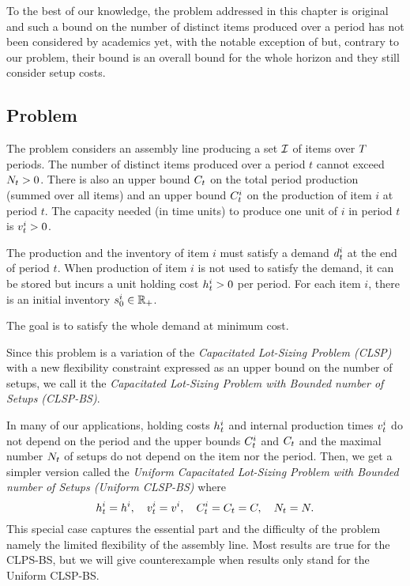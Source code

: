 To the best of our knowledge, the problem addressed in this chapter is original and such a bound on the number of distinct items produced over a period has not been considered by academics yet, with the notable exception of \cite{Rubaszewski2011} but, contrary to our problem, their bound is an overall bound for the whole horizon and they still consider setup costs.



\subsection{Problem}
\label{sec:PDP:deterministic:introduction:problem}

The problem considers an assembly line producing a set $\mathcal{I}$ of items over $T$ periods.
The number of distinct items produced over a period $t$ cannot exceed $N_t>0$.
There is also an upper bound $C_t$ on the total period production (summed over all items) and an upper bound $C_t^i$ on the production of item $i$ at period $t$.
The capacity needed (in time units) to produce one unit of $i$ in period $t$ is $v_t^i>0$.

The production and the inventory of item $i$ must satisfy a demand $d_t^i$ at the end of period $t$.
When production of item $i$ is not used to satisfy the demand, it can be stored but incurs a unit holding cost $h_t^i>0$ per period.
For each item $i$, there is an initial inventory $s_0^i\in\mathbb{R}_+$.

The goal is to satisfy the whole demand at minimum cost.

Since this problem is a variation of the \emph{Capacitated Lot-Sizing Problem (CLSP)} with a new flexibility constraint expressed as an upper bound on the number of setups, we call it the \emph{Capacitated Lot-Sizing Problem with Bounded number of Setups (CLSP-BS)}.

In many of our applications, holding costs $h_t^i$ and internal production times $v_t^i$ do not depend on the period and the upper bounds $C_t^i$ and $C_t$ and the maximal number $N_t$ of setups do not depend on the item nor the period.
Then, we get a simpler version called the \emph{Uniform Capacitated Lot-Sizing Problem with Bounded number of Setups (Uniform CLSP-BS)} where
\begin{equation}
  h_t^i=h^i,\quad
  v_t^i=v^i,\quad
  C_t^i=C_t=C,\quad
  N_t=N.
\end{equation}
This special case captures the essential part and the difficulty of the problem namely the limited flexibility of the assembly line.
Most results are true for the CLPS-BS, but we will give counterexample when results only stand for the Uniform CLSP-BS.


